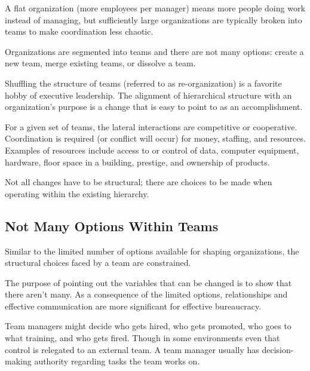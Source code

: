 A flat organization (more employees per manager) means more people doing work instead of managing, but sufficiently large organizations are typically broken into teams to make coordination less chaotic. 


Organizations are segmented into teams and there are not many options: create a new team, merge existing teams, or dissolve a team. 


Shuffling the structure of teams (referred to as re-organization) is a favorite hobby of executive leadership. The alignment of hierarchical structure with an organization's purpose is a change that is easy to point to as an accomplishment. 


For a given set of teams, the lateral interactions are competitive or cooperative. Coordination is required (or conflict will occur) for money, staffing, and resources. Examples of resources include access to or control of data, computer equipment, hardware, floor space in a building, prestige, and ownership of products.



Not all changes have to be structural; there are choices to be made when operating within the existing hierarchy.


\subsection*{Not Many Options Within Teams}



Similar to the limited number of options available for shaping organizations, the structural choices faced by a team are constrained. 


The purpose of pointing out the variables that can be changed is to show that there aren't many. As a consequence of the limited options, relationships and effective communication are more significant for effective bureaucracy. 


Team managers might decide who gets hired, who gets promoted, who goes to what training, and who gets fired. Though in some environments even that control is relegated to an external team. A team manager usually has decision-making authority regarding tasks the team works on. 

